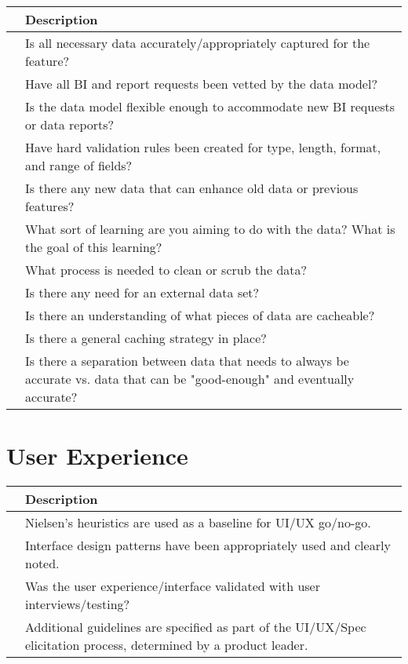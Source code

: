 \documentclass{article}
\begin{document}
\begin{center}
    \begin{tabular}{ | p{.25cm} || p{10cm} |}
    \hline
     & Description \\ \hline
     & Is all necessary data accurately/appropriately captured for the feature? \\ \hline
     & Have all BI and report requests been vetted by the data model? \\ \hline
     & Is the data model flexible enough to accommodate new BI requests or data reports? \\ \hline
     & Have hard validation rules been created for type, length, format, and range of fields? \\ \hline
     & Is there any new data that can enhance old data or previous features? \\ \hline
     & What sort of learning are you aiming to do with the data? What is the goal of this learning? \\ \hline
     & What process is needed to clean or scrub the data? \\ \hline
     & Is there any need for an external data set? \\ \hline
     & Is there an understanding of what pieces of data are cacheable? \\ \hline
     & Is there a general caching strategy in place? \\ \hline
     & Is there a separation between data that needs to always be accurate vs. data that can be "good-enough" and eventually accurate? \\ \hline
    \end{tabular}
\end{center}


\section{User Experience}

\begin{center}
    \begin{tabular}{ | p{.25cm} || p{10cm} |}
    \hline
     & Description \\ \hline
     & Nielsen's heuristics are used as a baseline for UI/UX go/no-go. \\ \hline
     & Interface design patterns have been appropriately used and clearly noted. \\ \hline
     & Was the user experience/interface validated with user interviews/testing? \\ \hline
     & Additional guidelines are specified as part of the UI/UX/Spec elicitation process, determined by a product leader. \\ \hline
    \end{tabular}
\end{center}
\end{document}

